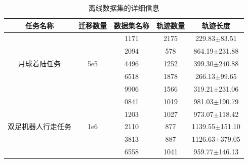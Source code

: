 \begin{table}[!ht]
    \caption{离线数据集的详细信息}
    \label{tab:the offline datasets}
    \small
    \setlength{\tabcolsep}{0.4em}
    \renewcommand{\arraystretch}{1.1}
    \centering
    \begin{tabular}{ccccc} 
        \toprule
        \textbf{任务名称}              & \textbf{迁移数量} & \textbf{数据集名称} & \textbf{轨迹数量} & \textbf{轨迹长度}  \\ 
        \hline
        \multirow{5}{*}{月球着陆任务}   & \multirow{5}{*}{5e5}           & 1171                 & 2175                            & 229.83$\pm$83.51               \\
                                        &                                & 2094                 & 578                             & 864.19$\pm$231.88              \\
                                        &                                & 4496                 & 1252                            & 399.30$\pm$240.88              \\
                                        &                                & 6518                 & 1878                            & 266.13$\pm$99.65               \\
                                        &                                & 9906                 & 1566                            & 319.21$\pm$231.06              \\ 
        \hline
        \multirow{5}{*}{双足机器人行走任务} & \multirow{5}{*}{1e6}           & 0841                 & 1019                            & 981.03$\pm$190.79              \\
                                        &                                & 1203                 & 1027                            & 973.07$\pm$118.42              \\
                                        &                                & 2110                 & 877                             & 1139.55$\pm$151.10             \\
                                        &                                & 3813                 & 887                             & 1126.63$\pm$379.05             \\
                                        &                                & 6558                 & 1041                            & 959.77$\pm$146.13              \\ 

\end{tabular}
\end{table}
